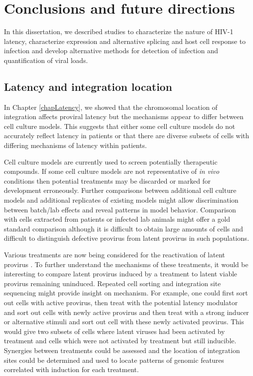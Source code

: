\documentclass[../sherrill-Mix_thesis.tex]{subfiles}
\begin{document}
\chapter{Conclusions and future directions}
\graphicspath{{im/}{conclusion/im/}}

In this dissertation, we described studies to characterize the nature of HIV-1 latency, characterize expression and alternative splicing and host cell response to infection and develop alternative methods for detection of infection and quantification of viral loads.


\section{Latency and integration location}

	In Chapter \ref{chapLatency}, we showed that the chromosomal location of integration affects proviral latency but the mechanisms appear to differ between cell culture models. This suggests that either some cell culture models do not accurately reflect latency in patients or that there are diverse subsets of cells with differing mechanisms of latency within patients.

	Cell culture models are currently used to screen potentially therapeutic compounds. If some cell culture models are not representative of \textit{in vivo} conditions then potential treatments may be discarded or marked for development erroneously. Further comparisons between additional cell culture models and additional replicates of existing models might allow discrimination between batch/lab effects and reveal patterns in model behavior. Comparison with cells extracted from patients or infected lab animals might offer a gold standard comparison although it is difficult to obtain large amounts of cells and difficult to distinguish defective provirus from latent provirus in such populations. %

	Various treatments are now being considered for the reactivation of latent provirus \citep{Spina2013}. To further understand the mechanisms of these treatments, it would be interesting to compare latent provirus induced by a treatment to latent viable provirus remaining uninduced. Repeated cell sorting and integration site sequencing might provide insight on mechanism. For example, one could first sort out cells with active provirus, then treat with the potential latency modulator and sort out cells with newly active provirus and then treat with a strong inducer or alternative stimuli and sort out cell with these newly activated provirus. This would give two subsets of cells where latent viruses had been activated by treatment and cells which were not activated by treatment but still inducible. Synergies between treatments could be assessed and the location of integration sites could be determined and used to locate patterns of genomic features correlated with induction for each treatment.
\end{document}
